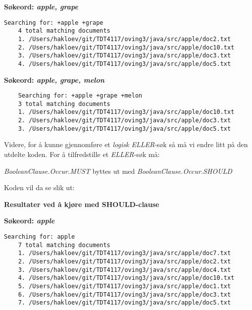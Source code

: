 \noindent \textbf{Søkeord: \textit{apple, grape}} \hfill

\begin{lstlisting}[frame=single]
    Searching for: +apple +grape
    4 total matching documents
    1. /Users/hakloev/git/TDT4117/oving3/java/src/apple/doc2.txt 
    2. /Users/hakloev/git/TDT4117/oving3/java/src/apple/doc10.txt 
    3. /Users/hakloev/git/TDT4117/oving3/java/src/apple/doc3.txt 
    4. /Users/hakloev/git/TDT4117/oving3/java/src/apple/doc5.txt 
\end{lstlisting}

\noindent \textbf{Søkeord: \textit{apple, grape, melon}} \hfill

\begin{lstlisting}
    Searching for: +apple +grape +melon 
    3 total matching documents 
    1. /Users/hakloev/git/TDT4117/oving3/java/src/apple/doc10.txt 
    2. /Users/hakloev/git/TDT4117/oving3/java/src/apple/doc3.txt 
    3. /Users/hakloev/git/TDT4117/oving3/java/src/apple/doc5.txt
\end{lstlisting}

\vspace{2mm}

\noindent Videre, for å kunne gjennomføre et \textit{logisk ELLER}-søk så må vi endre litt på den utdelte koden. For å tilfredstille et \textit{ELLER}-søk må:

\begin{center}
\textit{BooleanClause.Occur.MUST} byttes ut med \textit{BooleanClause.Occur.SHOULD}
\end{center}

\newpage
\noindent Koden vil da se slik ut:



\vspace{5mm}

\noindent \textbf{Resultater ved å kjøre med SHOULD-clause} \hfill

\noindent \textbf{Søkeord: \textit{apple}} \hfill
\begin{lstlisting}[frame=single]
Searching for: apple
    7 total matching documents
    1. /Users/hakloev/git/TDT4117/oving3/java/src/apple/doc7.txt
    2. /Users/hakloev/git/TDT4117/oving3/java/src/apple/doc2.txt
    3. /Users/hakloev/git/TDT4117/oving3/java/src/apple/doc4.txt
    4. /Users/hakloev/git/TDT4117/oving3/java/src/apple/doc10.txt
    5. /Users/hakloev/git/TDT4117/oving3/java/src/apple/doc1.txt
    6. /Users/hakloev/git/TDT4117/oving3/java/src/apple/doc3.txt
    7. /Users/hakloev/git/TDT4117/oving3/java/src/apple/doc5.txt
\end{lstlisting}

